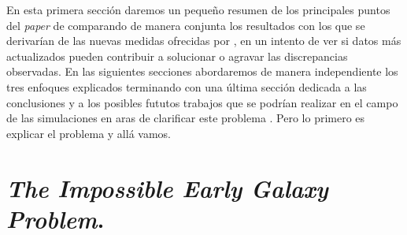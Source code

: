 En esta primera sección daremos un pequeño resumen de los principales puntos del \textit{paper} de \cite{steinhardt2016impossibly} comparando de manera conjunta los resultados con los que se derivarían de las nuevas medidas ofrecidas por \cite{behroozi2019universemachine}, en un intento de ver si datos más actualizados pueden contribuir a solucionar o agravar las discrepancias observadas. En las siguientes secciones abordaremos de manera independiente los tres enfoques explicados terminando con una última sección dedicada a las conclusiones y a los posibles fututos trabajos que se podrían realizar en el campo de las simulaciones en aras de clarificar este problema . Pero lo primero es explicar el problema y allá vamos.


\section{\textit{The Impossible Early Galaxy Problem}.}


